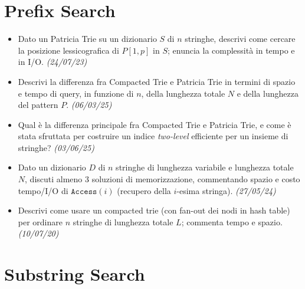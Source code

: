 \section{Prefix Search}

\begin{itemize}[leftmargin=1.4em]
\item {} Dato un Patricia Trie su un dizionario $S$ di $n$ stringhe, descrivi come cercare la
posizione lessicografica di $P[1,p]$ in $S$; enuncia la complessit\`a in tempo e in I/O.
\emph{(24/07/23)}
\item {} Descrivi la differenza fra Compacted Trie e Patricia Trie in termini di spazio e
tempo di query, in funzione di $n$, della lunghezza totale $N$ e della lunghezza del pattern $P$.
\emph{(06/03/25)}
\item {} Qual \`e la differenza principale fra Compacted Trie e Patricia Trie, e come \`e
stata sfruttata per costruire un indice \emph{two-level} efficiente per un insieme di stringhe?
\emph{(03/06/25)}
\item {} Dato un dizionario $D$ di $n$ stringhe di lunghezza variabile e lunghezza totale
$N$, discuti almeno 3 soluzioni di memorizzazione, commentando spazio e costo tempo/I/O di
$\texttt{Access}(i)$ (recupero della $i$-esima stringa). \emph{(27/05/24)}
\item {} Descrivi come usare un compacted trie (con fan-out dei nodi in hash table) per
ordinare $n$ stringhe di lunghezza totale $L$; commenta tempo e spazio. \emph{(10/07/20)}
\end{itemize}

\section{Substring Search}

